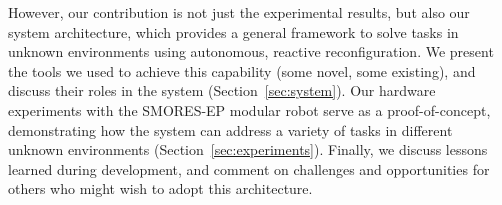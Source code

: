 \documentclass[journal]{IEEEtran}
\begin{document}
However, our contribution is not just the experimental results, but also our system architecture, which provides a general framework to solve tasks in unknown environments using autonomous, reactive reconfiguration.  We present the tools we used to achieve this capability (some novel, some existing), and discuss their roles in the system (Section~\ref{sec:system}).  Our hardware experiments with the SMORES-EP modular robot serve as a proof-of-concept, demonstrating how the system can address a variety of tasks in different unknown environments (Section~\ref{sec:experiments}).  Finally, we discuss lessons learned during development, and comment on challenges and opportunities for others who might wish to adopt this architecture.

%



\end{document}
